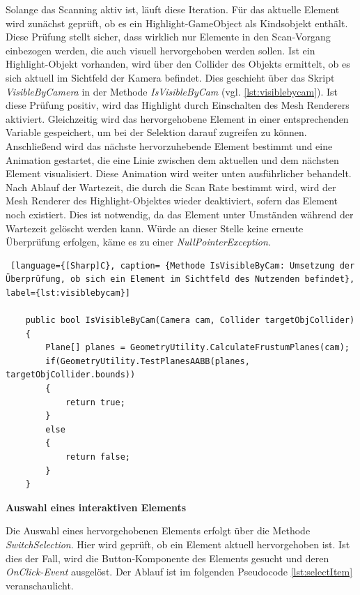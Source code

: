 Solange das Scanning aktiv ist, läuft diese Iteration. Für das aktuelle Element wird zunächst geprüft, ob es ein Highlight-GameObject als Kindsobjekt enthält. Diese Prüfung stellt sicher, dass wirklich nur Elemente in den Scan-Vorgang einbezogen werden, die auch visuell hervorgehoben werden sollen. Ist ein Highlight-Objekt vorhanden, wird über den Collider des Objekts ermittelt, ob es sich aktuell im Sichtfeld der Kamera befindet. Dies geschieht über das Skript \textit{VisibleByCamera} in der Methode \textit{IsVisibleByCam} (vgl. \autoref{lst:visiblebycam}). Ist diese Prüfung positiv, wird das Highlight durch Einschalten des Mesh Renderers aktiviert. Gleichzeitig wird das hervorgehobene Element in einer entsprechenden Variable gespeichert, um bei der Selektion darauf zugreifen zu können. Anschließend wird das nächste hervorzuhebende Element bestimmt und eine Animation gestartet, die eine Linie zwischen dem aktuellen und dem nächsten Element visualisiert. Diese Animation wird weiter unten ausführlicher behandelt. Nach Ablauf der Wartezeit, die durch die Scan Rate bestimmt wird, wird der Mesh Renderer des Highlight-Objektes wieder deaktiviert, sofern das Element noch existiert. Dies ist notwendig, da das Element unter Umständen während der Wartezeit gelöscht werden kann. Würde an dieser Stelle keine erneute Überprüfung erfolgen, käme es zu einer \textit{NullPointerException}.

\begin{lstlisting} [language={[Sharp]C}, caption= {Methode IsVisibleByCam: Umsetzung der Überprüfung, ob sich ein Element im Sichtfeld des Nutzenden befindet}, label={lst:visiblebycam}]

    public bool IsVisibleByCam(Camera cam, Collider targetObjCollider)
    {
        Plane[] planes = GeometryUtility.CalculateFrustumPlanes(cam);
        if(GeometryUtility.TestPlanesAABB(planes, targetObjCollider.bounds))
        {
            return true;
        }
        else
        {
            return false;
        }
    }
    \end{lstlisting}

\textbf{Auswahl eines interaktiven Elements}

Die Auswahl eines hervorgehobenen Elements erfolgt über die Methode \textit{SwitchSelection}. Hier wird geprüft, ob ein Element aktuell hervorgehoben ist. Ist dies der Fall, wird die Button-Komponente des Elements gesucht und deren \textit{OnClick-Event} ausgelöst. Der Ablauf ist im folgenden Pseudocode \autoref{lst:selectItem} veranschaulicht.

